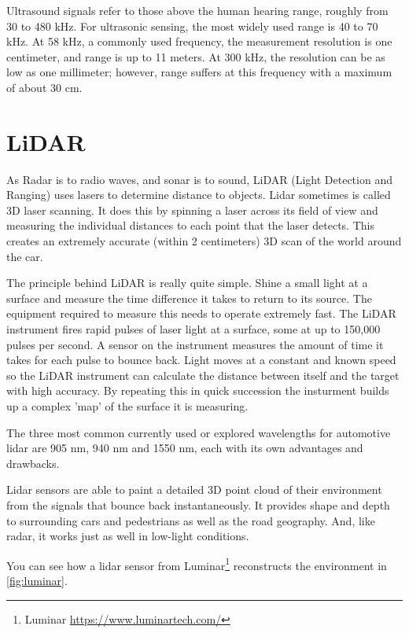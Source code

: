 Ultrasound signals refer to those above the human hearing range, roughly from 30
to 480 kHz. For ultrasonic sensing, the most widely used range is 40 to 70 kHz.
At 58 kHz, a commonly used frequency, the measurement resolution is one
centimeter, and range is up to 11 meters. At 300 kHz, the resolution can be as
low as one millimeter; however, range suffers at this frequency with a maximum
of about 30 cm.

\section{LiDAR}

As Radar is to radio waves, and sonar is to sound, LiDAR (Light Detection and
Ranging) uses lasers to determine distance to objects. Lidar sometimes is called
3D laser scanning. It does this by spinning a laser across its field of view and
measuring the individual distances to each point that the laser detects. This
creates an extremely accurate (within 2 centimeters) 3D scan of the world around
the car.

The principle behind LiDAR is really quite simple. Shine a small light at a
surface and measure the time difference it takes to return to its source. The
equipment required to measure this needs to operate extremely fast. The LiDAR
instrument fires rapid pulses of laser light at a surface, some at up to 150,000
pulses per second. A sensor on the instrument measures the amount of time it
takes for each pulse to bounce back. Light moves at a constant and known speed
so the LiDAR instrument can calculate the distance between itself and the target
with high accuracy. By repeating this in quick succession the insturment builds
up a complex 'map' of the surface it is measuring.

The three most common currently used or explored wavelengths for automotive
lidar are 905 nm, 940 nm and 1550 nm, each with its own advantages and
drawbacks.

Lidar sensors are able to paint a detailed 3D point cloud of their environment
from the signals that bounce back instantaneously. It provides shape and depth
to surrounding cars and pedestrians as well as the road geography. And, like
radar, it works just as well in low-light conditions.

You can see how a lidar sensor from Luminar\footnote{Luminar
    \url{https://www.luminartech.com/}} reconstructs the environment in
\autoref{fig:luminar}.

